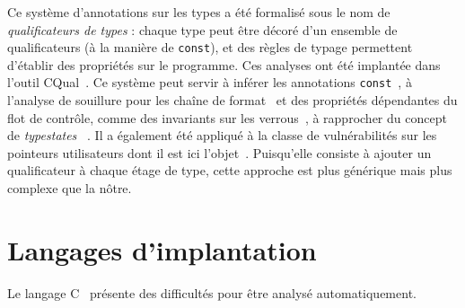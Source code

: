 Ce système d'annotations sur les types a été formalisé sous le nom de
\emph{qualificateurs de types} : chaque type peut être décoré d'un ensemble de
qualificateurs (à la manière de \texttt{const}), et des règles de typage
permettent d'établir des propriétés sur le programme. Ces analyses ont été
implantée dans l'outil CQual~\cite{toplas-quals}. Ce système peut servir à
inférer les annotations \texttt{const}~\cite{pldi99}, à l'analyse de souillure
pour les chaîne de format~\cite{usenix01} %
et des propriétés dépendantes du flot de contrôle, comme des invariants sur les
verrous~\cite{pldi02}, à rapprocher du concept de \emph{typestates}
~\cite{tse12-typestate}. Il a également été appliqué à la classe de
vulnérabilités sur les pointeurs utilisateurs dont il est ici
l'objet~\cite{cquk-usenix04}. Puisqu'elle consiste à ajouter un qualificateur à
chaque étage de type, cette approche est plus générique mais plus complexe que
la nôtre. %


\section{Langages d'implantation}


Le langage C~\cite{KandR} présente des difficultés pour être analysé
automatiquement.

